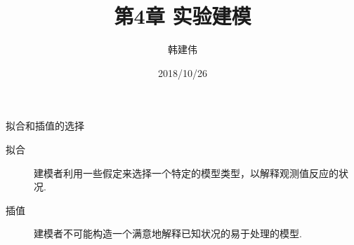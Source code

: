 \documentclass[UTF8]{ctexbeamer}
\title{第4章 实验建模}
\author{韩建伟}
\institute{
  信息学院\\
  \texttt{hanjianwei@zjgsu.du.cn}
}
\date{2018/10/26}
\begin{document}
\begin{frame}[plain]
  \titlepage{}
\end{frame}

\begin{frame}{拟合和插值的选择}

  \begin{description}
  \item[拟合] 建模者利用一些假定来选择一个特定的模型类型，以解释观测值反应的状况.
  \item[插值] 建模者不可能构造一个满意地解释已知状况的易于处理的模型.
  \end{description}

  \begin{figure}
    \centering
  \end{figure}


\end{frame}
\end{document}
